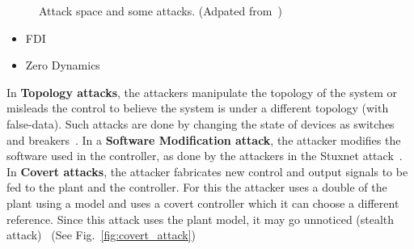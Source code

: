 \documentclass[../main.tex]{subfiles}
\begin{document}
\begin{figure}[h]
  \caption[Attack space and some attacks.]{Attack space and some attacks. (Adpated from~\cite{TeixeiraEtAl2015})}\label{fig:3_dimensions_attack_with_attacks}
\end{figure}


\begin{itemize}
  \item FDI~\cite{TeixeiraEtAl2015}
  \item Zero Dynamics~\cite{TeixeiraEtAl2012,TeixeiraEtAl2015,HoehnZhang2016}
\end{itemize}

In \textbf{Topology attacks}, the attackers manipulate the topology of the system or misleads the control to believe the system is under a different topology (with false-data). Such attacks are done by changing the state of devices as switches and breakers~\cite{KimTong2013,WuEtAl2016,ZhangEtAl2021c}.
In a \textbf{Software Modification attack}, the attacker modifies the software used in the controller, as done by the attackers in the Stuxnet attack~\cite{Langner2011}.
In \textbf{Covert attacks}, the attacker fabricates new control and output signals to be fed to the plant and the controller.
For this the attacker uses a double of the plant using a model and uses a covert controller which it can choose a different reference. Since this attack uses the plant model, it may go unnoticed (stealth attack)~\cite{Smith2015} (See Fig.~\ref{fig:covert_attack})
\end{document}
